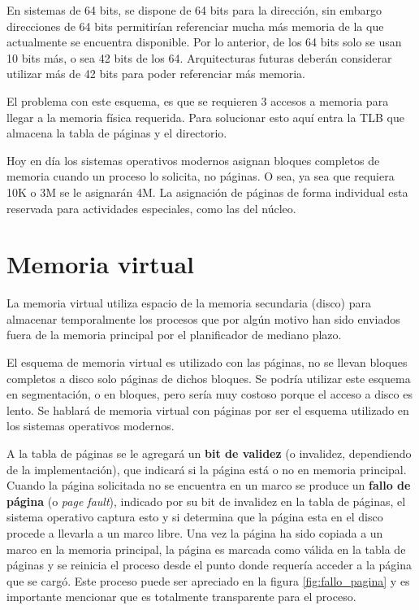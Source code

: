 En sistemas de 64 bits, se dispone de 64 bits para la dirección, sin embargo
direcciones de 64 bits permitirían referenciar mucha más memoria de la que
actualmente se encuentra disponible. Por lo anterior, de los 64 bits solo se
usan 10 bits más, o sea 42 bits de los 64. Arquitecturas futuras deberán
considerar utilizar más de 42 bits para poder referenciar más memoria.

El problema con este esquema, es que se requieren 3 accesos a memoria para
llegar a la memoria física requerida. Para solucionar esto aquí entra la TLB que
almacena la tabla de páginas y el directorio.

Hoy en día los sistemas operativos modernos asignan bloques completos de memoria
cuando un proceso lo solicita, no páginas. O sea, ya sea que requiera 10K o 3M
se le asignarán 4M. La asignación de páginas de forma individual esta reservada
para actividades especiales, como las del núcleo.

\section{Memoria virtual}
La memoria virtual utiliza espacio de la memoria secundaria (disco) para
almacenar temporalmente los procesos que por algún motivo han sido enviados
fuera de la memoria principal por el planificador de mediano plazo.

El esquema de memoria virtual es utilizado con las páginas, no se llevan bloques
completos a disco solo páginas de dichos bloques. Se podría utilizar este
esquema en segmentación, o en bloques, pero sería muy costoso porque el acceso a
disco es lento. Se hablará de memoria virtual con páginas por ser el esquema
utilizado en los sistemas operativos modernos.

A la tabla de páginas se le agregará un \textbf{bit de validez} (o invalidez,
dependiendo de la implementación), que indicará si la página está o no en
memoria principal. Cuando la página solicitada no se encuentra en un marco se
produce un \textbf{fallo de página} (o \textit{page fault}), indicado por su bit
de invalidez en la tabla de páginas, el sistema operativo captura esto y si
determina que la página esta en el disco procede a llevarla a un marco libre.
Una vez la página ha sido copiada a un marco en la memoria principal, la página
es marcada como válida en la tabla de páginas y se reinicia el proceso desde el
punto donde requería acceder a la página que se cargó. Este proceso puede ser
apreciado en la figura \ref{fig:fallo_pagina} y es importante mencionar que es
totalmente transparente para el proceso.

